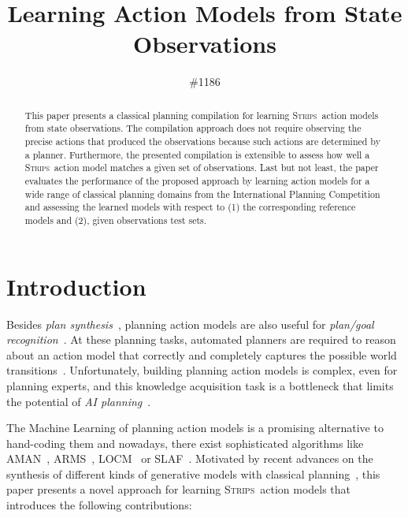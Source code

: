 \documentclass{article}
\title{Learning Action Models from State Observations}
\author{\#1186
}
\newcommand{\strips}{\textsc{Strips}}     %
\begin{document}
\maketitle

\begin{abstract}
This paper presents a classical planning compilation for learning \strips\ action models from state observations. The compilation approach does not require observing the precise actions that produced the observations because such actions are determined by a planner. Furthermore, the presented compilation is extensible to assess how well a \strips\ action model matches a given set of observations. Last but not least, the paper evaluates the performance of the proposed approach by learning action models for a wide range of classical planning domains from the International Planning Competition and assessing the learned models with respect to (1) the corresponding reference models and (2), given observations test sets. 
\end{abstract}


\section{Introduction}
Besides {\em plan synthesis}~\cite{ghallab2004automated}, planning action models are also useful for {\em plan/goal recognition}~\cite{ramirez2012plan}. At these planning tasks, automated planners are required to reason about an action model that correctly and completely captures the possible world transitions~\cite{geffner:book:2013}. Unfortunately, building planning action models is complex, even for planning experts, and this knowledge acquisition task is a bottleneck that limits the potential of {\em AI planning}~\cite{kambhampati:modellite:AAAI2007}.

The Machine Learning of planning action models is a promising alternative to hand-coding them and nowadays, there exist sophisticated algorithms like {\sc AMAN}~\cite{zhuo2013action}, {\sc ARMS}~\cite{yang2007learning}, {\sc LOCM}~\cite{cresswell2013acquiring} or {\sc SLAF}~\cite{amir:alearning:JAIR08}. Motivated by recent advances on the synthesis of different kinds of generative models with classical planning~\cite{bonet2009automatic,segovia2016hierarchical,segovia2017generating}, this paper presents a novel approach for learning \strips\ action models that introduces the following contributions:
\end{document}
